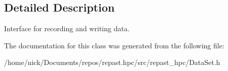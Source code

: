 \subsection{Detailed Description}
Interface for recording and writing data. 

The documentation for this class was generated from the following file\-:\begin{DoxyCompactItemize}
\item 
/home/nick/\-Documents/repos/repast.\-hpc/src/repast\-\_\-hpc/Data\-Set.\-h\end{DoxyCompactItemize}
